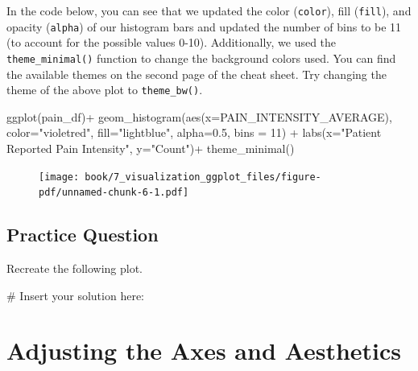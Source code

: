 \documentclass[
  letterpaper,
]{krantz}
\makeatletter
\newenvironment{Shaded}{\begin{snugshade}}{\end{snugshade}}
\newcommand{\AttributeTok}[1]{\textcolor[rgb]{0.40,0.45,0.13}{#1}}
\newcommand{\CommentTok}[1]{\textcolor[rgb]{0.37,0.37,0.37}{#1}}
\newcommand{\DecValTok}[1]{\textcolor[rgb]{0.68,0.00,0.00}{#1}}
\newcommand{\FloatTok}[1]{\textcolor[rgb]{0.68,0.00,0.00}{#1}}
\newcommand{\FunctionTok}[1]{\textcolor[rgb]{0.28,0.35,0.67}{#1}}
\newcommand{\NormalTok}[1]{\textcolor[rgb]{0.00,0.23,0.31}{#1}}
\newcommand{\SpecialCharTok}[1]{\textcolor[rgb]{0.37,0.37,0.37}{#1}}
\newcommand{\StringTok}[1]{\textcolor[rgb]{0.13,0.47,0.30}{#1}}
\newenvironment{kframe}{%
\medskip{}
\setlength{\fboxsep}{.8em}
 \def\at@end@of@kframe{}%
 \ifinner\ifhmode%
  \def\at@end@of@kframe{\end{minipage}}%
  \begin{minipage}{\columnwidth}%
 \fi\fi%
 \def\FrameCommand##1{\hskip\@totalleftmargin \hskip-\fboxsep
 \colorbox{shadecolor}{##1}\hskip-\fboxsep
     \hskip-\linewidth \hskip-\@totalleftmargin \hskip\columnwidth}%
 \MakeFramed {\advance\hsize-\width
   \@totalleftmargin\z@ \linewidth\hsize
   \@setminipage}}%
 {\par\unskip\endMakeFramed%
 \at@end@of@kframe}
\renewenvironment{Shaded}{\begin{kframe}}{\end{kframe}}
\makeatother
\begin{document}
In the code below, you can see that we updated the color
(\texttt{color}), fill (\texttt{fill}), and opacity (\texttt{alpha}) of
our histogram bars and updated the number of bins to be 11 (to account
for the possible values 0-10). Additionally, we used the
\texttt{theme\_minimal()} function to change the background colors used.
You can find the available themes on the second page of the cheat sheet.
Try changing the theme of the above plot to \texttt{theme\_bw()}.

\begin{Shaded}
\begin{Highlighting}[]
\FunctionTok{ggplot}\NormalTok{(pain\_df)}\SpecialCharTok{+}
  \FunctionTok{geom\_histogram}\NormalTok{(}\FunctionTok{aes}\NormalTok{(}\AttributeTok{x=}\NormalTok{PAIN\_INTENSITY\_AVERAGE), }\AttributeTok{color=}\StringTok{"violetred"}\NormalTok{, }
                 \AttributeTok{fill=}\StringTok{"lightblue"}\NormalTok{, }\AttributeTok{alpha=}\FloatTok{0.5}\NormalTok{, }\AttributeTok{bins =} \DecValTok{11}\NormalTok{) }\SpecialCharTok{+}
  \FunctionTok{labs}\NormalTok{(}\AttributeTok{x=}\StringTok{"Patient Reported Pain Intensity"}\NormalTok{, }\AttributeTok{y=}\StringTok{"Count"}\NormalTok{)}\SpecialCharTok{+}
  \FunctionTok{theme\_minimal}\NormalTok{()}
\end{Highlighting}
\end{Shaded}

\begin{figure}[H]

{\centering \texttt{[image: book/7\_visualization\_ggplot\_files/figure-pdf/unnamed-chunk-6-1.pdf]}

}

\end{figure}

\hypertarget{practice-question-13}{%
\subsection{Practice Question}\label{practice-question-13}}

Recreate the following plot.

\begin{Shaded}
\begin{Highlighting}[]
\CommentTok{\# Insert your solution here: }
\end{Highlighting}
\end{Shaded}

\hypertarget{adjusting-the-axes-and-aesthetics}{%
\section{Adjusting the Axes and
Aesthetics}\label{adjusting-the-axes-and-aesthetics}}
\end{document}
